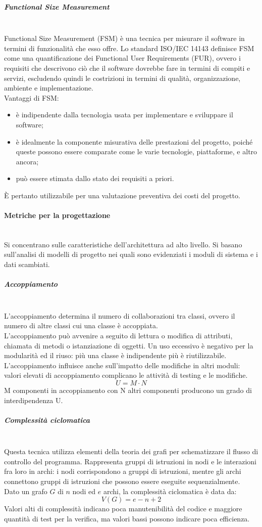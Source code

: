 \subparagraph{Functional Size Measurement}\mbox{}\\
Functional Size Measurement (FSM) è una tecnica per misurare il software in termini di funzionalità che esso offre. Lo standard ISO/IEC 14143 definisce FSM come una quantificazione dei Functional User Requirements (FUR), ovvero i requisiti che descrivono ciò che il software dovrebbe fare in termini di compiti e servizi, escludendo quindi le costrizioni in termini di qualità, organizzazione, ambiente e implementazione.\\
Vantaggi di FSM:
\begin{itemize}
	\item è indipendente dalla tecnologia usata per implementare e sviluppare il software;
	\item è idealmente la componente misurativa delle prestazioni del progetto, poiché queste possono essere comparate come le varie tecnologie, piattaforme, e altro ancora;
	\item può essere stimata dallo stato dei requisiti a priori.
\end{itemize}
\`{E} pertanto utilizzabile per una valutazione preventiva dei costi del progetto.

\paragraph{Metriche per la progettazione}\mbox{}\\
Si concentrano sulle caratteristiche dell'architettura ad alto livello. Si basano sull'analisi di modelli di progetto nei quali sono evidenziati i moduli di sistema e i dati scambiati.

\subparagraph{Accoppiamento}\mbox{}\\
L'accoppiamento determina il numero di collaborazioni tra classi, ovvero il numero di altre classi cui una classe è accoppiata.\\
L'accoppiamento può avvenire a seguito di lettura o modifica di attributi, chiamata di metodi o istanziazione di oggetti. Un uso eccessivo è negativo per la modularità ed il riuso: più una classe è indipendente più è riutilizzabile. L'accoppiamento influisce anche sull'impatto delle modifiche in altri moduli: valori elevati di accoppiamento complicano le attività di testing e le modifiche.
\[ U = M \cdot N \]
M componenti in accoppiamento con N altri componenti producono un grado di interdipendenza U.

\subparagraph{Complessità ciclomatica}\mbox{}\\
Questa tecnica utilizza elementi della teoria dei grafi per schematizzare il flusso di controllo del programma. Rappresenta gruppi di istruzioni in nodi e le interazioni fra loro in archi: i nodi corrispondono a gruppi di istruzioni, mentre gli archi connettono gruppi di istruzioni che possono essere eseguite sequenzialmente.\\
Dato un grafo $G$ di $n$ nodi ed $e$ archi, la complessità ciclomatica è data da:
\[ V\left(G\right) = e - n + 2 \]
Valori alti di complessità indicano poca manutenibilità del codice e maggiore quantità di test per la verifica, ma valori bassi possono indicare poca efficienza.


